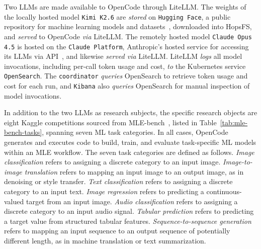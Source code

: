 \documentclass[
english,                 %
bibtex,                  %
includeExtraAbstracts, %
]{kththesis}
\numberwithin{listing}{chapter}
\begin{document}
Two \glspl{LLM} are made available to OpenCode through Lite\gls{LLM}. The weights of the locally hosted model \texttt{Kimi K2.6} are \emph{stored} on \texttt{Hugging Face}, a public repository for machine learning models and datasets~\cite{hugging_face_inc_hugging_2026}, downloaded into Hops\gls{FS}, and \emph{served} to OpenCode \emph{via} Lite\gls{LLM}. The remotely hosted model \texttt{Claude Opus 4.5} is hosted on the \texttt{Claude Platform}, Anthropic's hosted service for accessing its \glspl{LLM} via \gls{API}~\cite{anthropic_pbc_claude_2026}, and likewise \emph{served via} Lite\gls{LLM}. Lite\gls{LLM} \emph{logs} all model invocations, including per-call token usage and cost, \emph{to} the Kubernetes service \texttt{OpenSearch}. The \texttt{coordinator} \emph{queries} OpenSearch to retrieve token usage and cost for each run, and \texttt{Kibana} also \emph{queries} OpenSearch for manual inspection of model invocations.

In addition to the two \glspl{LLM} as research subjects, the specific research objects are eight Kaggle competitions sourced from \gls{MLE}-bench~\cite{chan_mle-bench_2025}, listed in Table~\ref{tab:mle-bench-tasks}, spanning seven \gls{ML} task categories. In all cases, OpenCode generates and executes code to build, train, and evaluate task-specific \gls{ML} models within an \gls{MLE} workflow. The seven task categories are defined as follows. \emph{Image classification} refers to assigning a discrete category to an input image. \emph{Image-to-image translation} refers to mapping an input image to an output image, as in denoising or style transfer. \emph{Text classification} refers to assigning a discrete category to an input text. \emph{Image regression} refers to predicting a continuous-valued target from an input image. \emph{Audio classification} refers to assigning a discrete category to an input audio signal. \emph{Tabular prediction} refers to predicting a target value from structured tabular features. \emph{Sequence-to-sequence generation} refers to mapping an input sequence to an output sequence of potentially different length, as in machine translation or text summarization.
\end{document}
